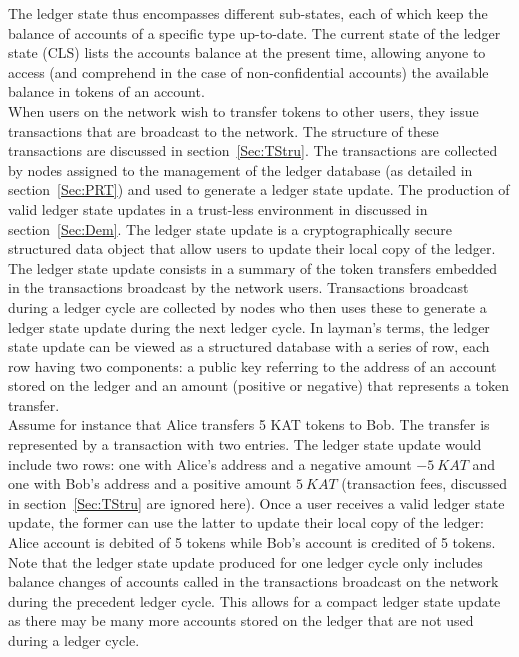 The ledger state thus encompasses different sub-states, each of which keep the balance of accounts of a specific type up-to-date. The current state of the ledger state (CLS) lists the accounts balance at the present time, allowing anyone to access (and comprehend in the case of non-confidential accounts) the available balance in tokens of an account. \\

When users on the network wish to transfer tokens to other users, they issue transactions that are broadcast to the network. The structure of these transactions are discussed in section~\ref{Sec:TStru}. The transactions are collected by nodes assigned to the management of the ledger database (as detailed in section~\ref{Sec:PRT}) and used to generate a ledger state update. The production of valid ledger state updates in a trust-less environment in discussed in section~\ref{Sec:Dem}. The ledger state update is a cryptographically secure structured data object that allow users to update their local copy of the ledger. \\

The ledger state update consists in a summary of the token transfers embedded in the transactions broadcast by the network users. Transactions broadcast during a ledger cycle are collected by nodes who then uses these to generate a ledger state update during the next ledger cycle. In layman's terms, the ledger state update can be viewed as a structured database with a series of row, each row having two components: a public key referring to the address of an account stored on the ledger and an amount (positive or negative) that represents a token transfer.\\ 

Assume for instance that Alice transfers 5 KAT tokens to Bob. The transfer is represented by a transaction with two entries. The ledger state update would include two rows: one with Alice's address and a negative amount $-5~KAT$ and one with Bob's address and a positive amount $5~KAT$ (transaction fees, discussed in section~\ref{Sec:TStru} are ignored here). Once a user receives a valid ledger state update, the former can use the latter to update their local copy of the ledger: Alice account is debited of 5 tokens while Bob's account is credited of 5 tokens. Note that the ledger state update produced for one ledger cycle only includes balance changes of accounts called in the transactions broadcast on the network during the precedent ledger cycle. This allows for a compact ledger state update as there may be many more accounts stored on the ledger that are not used during a ledger cycle.\\

